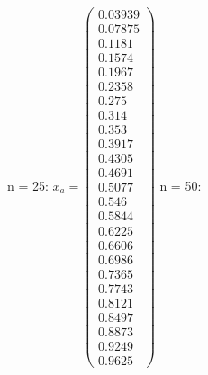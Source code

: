 \documentclass{udpreport}
\begin{document}
\begin{enumerate}
\begin{enumerate}
\begin{itemize}
					 n = 25: 
					$x_{a} = \left(\begin{array}{c} 0.03939\\ 0.07875\\ 0.1181\\ 0.1574\\ 0.1967\\ 0.2358\\ 0.275\\ 0.314\\ 0.353\\ 0.3917\\ 0.4305\\ 0.4691\\ 0.5077\\ 0.546\\ 0.5844\\ 0.6225\\ 0.6606\\ 0.6986\\ 0.7365\\ 0.7743\\ 0.8121\\ 0.8497\\ 0.8873\\ 0.9249\\ 0.9625 \end{array}\right) $	
					 n = 50:

\end{itemize}
\end{enumerate}
\end{enumerate}
\end{document}
